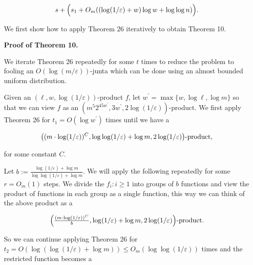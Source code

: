 \documentclass[10pt,a4paper]{article}
\begin{document}
\[\begin{gathered}
s+\Bigl{(}s_{1}+O_{m}((\log(1/\varepsilon)+w)\log w+\log\log n)\Bigr{)}.
\end{gathered}\]






We first show how to apply Theorem 26 iteratively to obtain Theorem 10.\par




\par\medskip\noindent\textbf{Proof of Theorem 10.}\par




We iterate Theorem 26 repeatedly for some $t$ times to reduce the problem to fooling an $O(\log(m/\varepsilon))$-junta which can be done using an almost bounded uniform distribution.\par




Given an $(\ell,w,\log(1/\varepsilon))$-product $f$, let $w^{\prime}=\max\{w,\log\ell,\log m\}$ so that we can view $f$ as an $(m^{5}2^{45w^{\prime}},3w^{\prime},2\log(1/\varepsilon))$-product.
We first apply Theorem 26 for $t_{1}=O(\log w^{\prime})$ times until we have a\par


\[\begin{gathered}
\bigl{(}(m\cdot\log(1/\varepsilon))^{C},\log\log(1/\varepsilon)+\log m,2\log(1/\varepsilon)\bigr{)}\text{-product},
\end{gathered}\]


for some constant $C$.\par




Let $b:=\frac{\log(1/\varepsilon)+\log m}{\log\log(1/\varepsilon)+\log m}$.
We will apply the following repeatedly for some $r=O_{m}(1)$ steps.
We divide the $f_{i}:i\geq 1$ into groups of $b$ functions and view the product of functions in each group as a single function, this way we can think of the above product as a\par


\[\begin{gathered}
\Bigl{(}\tfrac{(m\cdot\log(1/\varepsilon))^{C}}{b},\log(1/\varepsilon)+\log m,2\log(1/\varepsilon)\Bigr{)}\text{-product.}
\end{gathered}\]


So we can continue applying Theorem 26 for $t_{2}=O(\log(\log(1/\varepsilon)+\log m))\leq O_{m}(\log\log(1/\varepsilon))$ times and the restricted function becomes a\par
\end{document}
